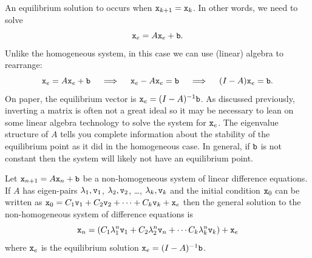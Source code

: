 An equilibrium solution to occurs when $\texttt{x}_{k+1} = \texttt{x}_k$.  In other words, we need to
solve
\[ \texttt{x}_e = A \texttt{x}_e + \texttt{b}. \]
Unlike the homogeneous system, in this case we can use (linear) algebra to rearrange:
\[ \texttt{x}_e = A \texttt{x}_e + \texttt{b} \quad \implies \quad \texttt{x}_e - A \texttt{x}_e = \texttt{b} \quad \implies
\quad (I-A)\texttt{x}_e = \texttt{b}. \]
On paper, the equilibrium vector is $\texttt{x}_e = (I-A)^{-1} \texttt{b}$.  As discussed previously,
inverting a matrix is often not a great ideal so it may be necessary to lean on some
linear algebra technology to solve the system for $\texttt{x}_e$.  The eigenvalue structure of
$A$ tells you complete information about the stability of the equilibrium point as it did
in the homogeneous case.  In general, if $\texttt{b}$ is not constant then the system will
likely not have an equilibrium point.

\begin{thm}
    Let $\texttt{x}_{n+1} = A \texttt{x}_n + \texttt{b}$ be a non-homogeneous system of linear difference
    equations.  If $A$ has eigen-pairs $\lambda_1, \texttt{v}_1$, $\lambda_2, \texttt{v}_2$, \dots,
    $\lambda_k, \texttt{v}_k$ and the initial condition $\texttt{x}_0$ can be written as $\texttt{x}_0 = C_1
    \texttt{v}_1 + C_2 \texttt{v}_2 + \cdots + C_k \texttt{v}_k + \texttt{x}_e$ then the general solution to the
    non-homogeneous system of difference equations is
    \[ \texttt{x}_n = \left( C_1 \lambda_1^n \texttt{v}_1 + C_2 \lambda_2^n \texttt{v}_n + \cdots C_k
    \lambda_k^n \texttt{v}_k \right) + \texttt{x}_e \]
    where $\texttt{x}_e$ is the equilibrium solution $\texttt{x}_e = (I-A)^{-1} \texttt{b}$.
    \label{thm:10.8.gen_soln_nonhom}
\end{thm}

